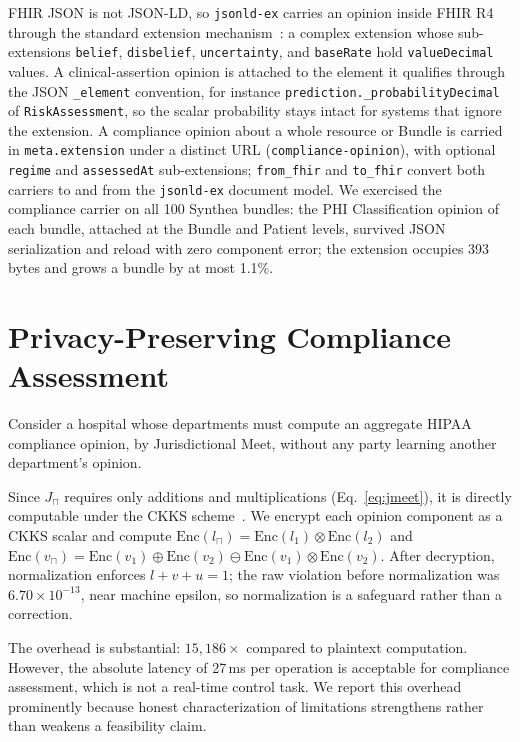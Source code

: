 \documentclass[conference]{IEEEtran}
\begin{document}
FHIR JSON is not JSON-LD, so \texttt{jsonld-ex} carries an opinion inside FHIR R4 through the standard extension mechanism~\cite{hl7fhirr4}: a complex extension whose sub-extensions \texttt{belief}, \texttt{disbelief}, \texttt{uncertainty}, and \texttt{baseRate} hold \texttt{valueDecimal} values. A clinical-assertion opinion is attached to the element it qualifies through the JSON \texttt{\_element} convention, for instance \texttt{prediction.\_probabilityDecimal} of \texttt{RiskAssessment}, so the scalar probability stays intact for systems that ignore the extension. A compliance opinion about a whole resource or Bundle is carried in \texttt{meta.extension} under a distinct URL (\texttt{compliance-opinion}), with optional \texttt{regime} and \texttt{assessedAt} sub-extensions; \texttt{from\_fhir} and \texttt{to\_fhir} convert both carriers to and from the \texttt{jsonld-ex} document model. We exercised the compliance carrier on all 100 Synthea bundles: the PHI Classification opinion of each bundle, attached at the Bundle and Patient levels, survived JSON serialization and reload with zero component error; the extension occupies 393 bytes and grows a bundle by at most 1.1\%.

\section{Privacy-Preserving Compliance Assessment}

Consider a hospital whose departments must compute an aggregate HIPAA compliance opinion, by Jurisdictional Meet, without any party learning another department's opinion.

Since $J_\sqcap$ requires only additions and multiplications (Eq.~\ref{eq:jmeet}), it is directly computable under the CKKS scheme~\cite{cheon2017ckks}. We encrypt each opinion component as a CKKS scalar and compute $\text{Enc}(l_\sqcap) = \text{Enc}(l_1) \otimes \text{Enc}(l_2)$ and $\text{Enc}(v_\sqcap) = \text{Enc}(v_1) \oplus \text{Enc}(v_2) \ominus \text{Enc}(v_1) \otimes \text{Enc}(v_2)$. After decryption, normalization enforces $l + v + u = 1$; the raw violation before normalization was $6.70 \times 10^{-13}$, near machine epsilon, so normalization is a safeguard rather than a correction.



The overhead is substantial: $15{,}186\times$ compared to plaintext computation. However, the absolute latency of 27\,ms per operation is acceptable for compliance assessment, which is not a real-time control task. We report this overhead prominently because honest characterization of limitations strengthens rather than weakens a feasibility claim.
\end{document}
